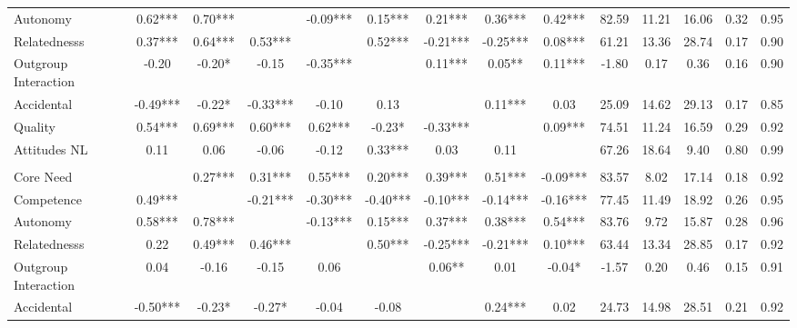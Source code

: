 \begin{table}
\begin{minipage}[t][\textheight][t]{\textwidth}
{\begin{tabular}[t]{lccccccccccccc}
\hspace{1em}Autonomy & 0.62*** & 0.70*** &  & -0.09*** & 0.15*** & 0.21*** & 0.36*** & 0.42*** & 82.59 & 11.21 & 16.06 & 0.32 & 0.95\\
\hspace{1em}Relatednesss & 0.37*** & 0.64*** & 0.53*** &  & 0.52*** & -0.21*** & -0.25*** & 0.08*** & 61.21 & 13.36 & 28.74 & 0.17 & 0.90\\
\hspace{1em}Outgroup Interaction & -0.20 & -0.20* & -0.15 & -0.35*** &  & 0.11*** & 0.05** & 0.11*** & -1.80 & 0.17 & 0.36 & 0.16 & 0.90\\
\hspace{1em}Accidental & -0.49*** & -0.22* & -0.33*** & -0.10 & 0.13 &  & 0.11*** & 0.03 & 25.09 & 14.62 & 29.13 & 0.17 & 0.85\\
\hspace{1em}Quality & 0.54*** & 0.69*** & 0.60*** & 0.62*** & -0.23* & -0.33*** &  & 0.09*** & 74.51 & 11.24 & 16.59 & 0.29 & 0.92\\
\hspace{1em}Attitudes NL & 0.11 & 0.06 & -0.06 & -0.12 & 0.33*** & 0.03 & 0.11 &  & 67.26 & 18.64 & 9.40 & 0.80 & 0.99\\
\addlinespace[0.3em]
\multicolumn{14}{l}{\textbf{Study 3}}\\
\hspace{1em}Core Need &  & 0.27*** & 0.31*** & 0.55*** & 0.20*** & 0.39*** & 0.51*** & -0.09*** & 83.57 & 8.02 & 17.14 & 0.18 & 0.92\\
\hspace{1em}Competence & 0.49*** &  & -0.21*** & -0.30*** & -0.40*** & -0.10*** & -0.14*** & -0.16*** & 77.45 & 11.49 & 18.92 & 0.26 & 0.95\\
\hspace{1em}Autonomy & 0.58*** & 0.78*** &  & -0.13*** & 0.15*** & 0.37*** & 0.38*** & 0.54*** & 83.76 & 9.72 & 15.87 & 0.28 & 0.96\\
\hspace{1em}Relatednesss & 0.22 & 0.49*** & 0.46*** &  & 0.50*** & -0.25*** & -0.21*** & 0.10*** & 63.44 & 13.34 & 28.85 & 0.17 & 0.92\\
\hspace{1em}Outgroup Interaction & 0.04 & -0.16 & -0.15 & 0.06 &  & 0.06** & 0.01 & -0.04* & -1.57 & 0.20 & 0.46 & 0.15 & 0.91\\
\hspace{1em}Accidental & -0.50*** & -0.23* & -0.27* & -0.04 & -0.08 &  & 0.24*** & 0.02 & 24.73 & 14.98 & 28.51 & 0.21 & 0.92\\

\end{tabular}}
\end{minipage}
\end{table}
